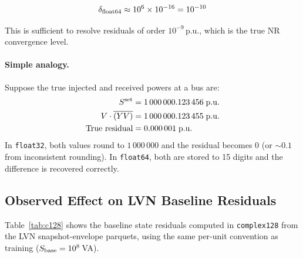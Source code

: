 \documentclass{article}
\begin{document}
\begin{equation}
  \delta_{\rm float64} \approx 10^6 \times 10^{-16} = 10^{-10}
\end{equation}

This is sufficient to resolve residuals of order $10^{-9}$\,p.u., which
is the true NR convergence level.

\paragraph{Simple analogy.}
Suppose the true injected and received powers at a bus are:
\begin{align*}
  S^{\rm set} &= 1\,000\,000.123\,456\;\text{p.u.}\\
  V \cdot \overline{(YV)} &= 1\,000\,000.123\,455\;\text{p.u.}\\
  \text{True residual} &= 0.000\,001\;\text{p.u.}
\end{align*}
In \texttt{float32}, both values round to $1\,000\,000$ and the residual
becomes $0$ (or $\sim 0.1$ from inconsistent rounding).  In
\texttt{float64}, both are stored to 15 digits and the difference is
recovered correctly.

\subsection{Observed Effect on LVN Baseline Residuals}

Table~\ref{tab:c128} shows the baseline state residuals computed in
\texttt{complex128} from the LVN snapshot-envelope parquets, using the
same per-unit convention as training ($S_{\rm base}=10^8$\,VA).
\end{document}
